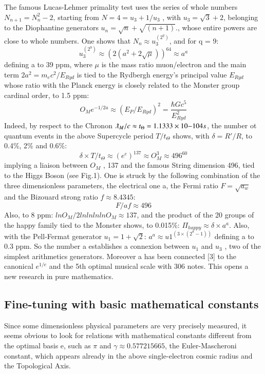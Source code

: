 \documentclass[twoside,draft]{article}
\begin{document}
\begin{sloppypar}
{The famous Lucas-Lehmer primality test uses the series of whole numbers $N_{n+1} = N_{n}^{2}-2$,
starting from $N = 4 = u_{3} + 1/u_{3}$ , with $u_{3} = \sqrt{3} + 2$, belonging to the Diophantine generators $u_{n} = \sqrt{n} + \sqrt{(n+1)}$., whose entire powers are close to whole numbers. One shows that $N_{n} \approx u_{3}^{(2^{q})}$, and for q = 9:
\begin{equation}
u_{3}^(2^9) \approx (2(a^{2} + 2\sqrt{\mu}))^{64} \approx a^{a}
\end{equation}
defining a to 39 ppm, where $\mu$ is the mass ratio muon/electron and the main term $2a^{2} = m_{e} c^{2}/E_{Ryd}$ is
tied to the Rydbergh energy's principal value $E_{Ryd}$ whose ratio with the Planck energy is closely
related to the Monster group cardinal order, to 1.5 ppm:
\begin{equation}
O_{M} e^{-1/2a} \approx (E_{P} /E_{Ryd})^{2} = \frac{\hbar Gc^{5}}{E_{Ryd}^{2}}
\end{equation}
Indeed, by respect to the Chronon $\lambdabar_M /c \approx t_{\Theta} = 1.1333 \times 10{-104} s$, the number ot quantum events in
the above Supercycle period $T/ t_{\Theta}$ shows, with $\delta = R\prime/R$, to 0.4\%, 2\% and 0.6\%:
$$\delta \times T/t_{\Theta} \approx (e^{e})^{137} \approx O_{M}^{3} \approx 496^{60}$$
implying a liaison between $O_{M}$ , 137 and the famous String dimension 496, tied to the Higgs Boson
(see Fig.1). One is struck by the following combination of the three dimensionless parameters, the electrical
one a, the Fermi ratio $F =\sqrt{a_{w}}$ and the Bizouard strong ratio $f \approx 8.4345$:
$$F/af \approx 496$$
Also, to 8 ppm: $lnO_{M} /2lnlnlnlnO_{M} \approx 137$, and the product of the 20 groups of the happy family tied
to the Monster shows, to 0.015\%:
$\Pi_{happy} \approx \delta \times a^{a}$. Also, with the Pell-Fermat generator $u_{1} = 1 + \sqrt{2}$:
$a^{a} \approx u 1^(3\times(2^{8}-1))$
defining a to 0.3 ppm. So the number a establishes a connexion between $u_{1}$ and $u_{3}$ , two of the
simplest arithmetics generators. Moreover a has been connected [3] to the canonical $e^{1/e}$ and the
5th optimal musical scale with 306 notes. This opens a new research in pure mathematics.

\subsection{Fine-tuning with basic mathematical constants}
Since some dimensionless physical parameters are very precisely measured, it seems obvious to look for
relations with mathematical constants different from the optimal basis e, such as $\pi$ and $\gamma \approx
0.577215665$, the Euler-Mascheroni constant, which appears already in the above single-electron
cosmic radius and the Topological Axis.

}
\end{sloppypar}
\end{document}
